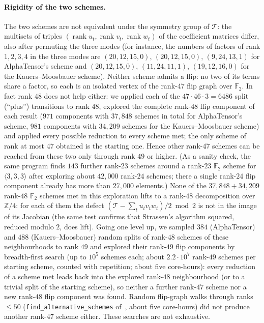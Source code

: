 \documentclass[11pt]{article}
\numberwithin{equation}{section}
\theoremstyle{definition}
\theoremstyle{remark}
\newcommand{\F}{\mathbb F}
\newcommand{\Z}{\mathbb Z}
\newcommand{\T}{\mathcal T}
\begin{document}
\paragraph{Rigidity of the two schemes.} The two schemes are not equivalent under the symmetry group of $\T$: the multisets of triples
$(\operatorname{rank}u_t,\operatorname{rank}v_t,\operatorname{rank}w_t)$ of the coefficient matrices differ,
also after permuting the three modes (for instance, the numbers of factors of rank $1,2,3,4$ in the three
modes are $(20,12,15,0)$, $(20,12,15,0)$, $(9,24,13,1)$ for AlphaTensor's scheme and $(20,12,15,0)$,
$(11,24,11,1)$, $(19,12,16,0)$ for the Kauers--Moosbauer scheme). Neither scheme admits a flip: no two of its terms share a factor, so each is an isolated
vertex of the rank-$47$ flip graph over $\F_2$. In fact rank $48$ does not help either: we applied each
of the $47\cdot46\cdot3=6486$ split (``plus'') transitions to rank $48$, explored the complete rank-$48$ flip
component of each result ($971$ components with $37{,}848$ schemes in total for AlphaTensor's scheme,
$981$ components with $34{,}209$ schemes for the Kauers--Moosbauer scheme) and applied every possible
reduction to every scheme met; the only scheme of rank at most $47$ obtained is the starting one. Hence
other rank-$47$ schemes can be reached from these two only through rank $49$ or higher. (As a sanity
check, the same program finds $143$ further rank-$23$ schemes around a rank-$23$ $\F_2$ scheme for
$\langle3,3,3\rangle$ after exploring about $42{,}000$ rank-$24$ schemes; there a single rank-$24$ flip
component already has more than $27{,}000$ elements.) None of the $37{,}848+34{,}209$ rank-$48$ $\F_2$
schemes met in this exploration lifts to a rank-$48$ decomposition over $\Z/4$: for each of them the defect
$(\T-\sum_t u_tv_tw_t)/2 \bmod 2$ is not in the image of its Jacobian (the same test confirms that
Strassen's algorithm squared, reduced modulo $2$, does lift). Going one level up, we sampled $384$ (AlphaTensor) and $488$ (Kauers--Moosbauer) random splits of
rank-$48$ schemes of these neighbourhoods to rank $49$ and explored their rank-$49$ flip components by
breadth-first search (up to $10^5$ schemes each; about $2.2\cdot10^7$ rank-$49$ schemes per starting
scheme, counted with repetition; about five core-hours): every reduction of a scheme met leads back into the explored rank-$48$
neighbourhood (or to a trivial split of the starting scheme), so neither a further rank-$47$ scheme nor a
new rank-$48$ flip component was found. Random flip-graph walks through
ranks $\le 50$ (\texttt{find\_alternative\_schemes} of~\cite{perminov}, about five core-hours) did not
produce another rank-$47$ scheme either. These searches are not exhaustive.
\end{document}
